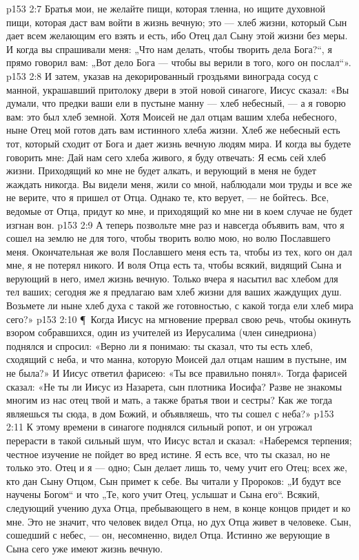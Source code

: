 \vs p153 2:7 Братья мои, не желайте пищи, которая тленна, но ищите духовной пищи, которая даст вам войти в жизнь вечную; это --- хлеб жизни, который Сын дает всем желающим его взять и есть, ибо Отец дал Сыну этой жизни без меры. И когда вы спрашивали меня: „Что нам делать, чтобы творить дела Бога?“, я прямо говорил вам: „Вот дело Бога --- чтобы вы верили в того, кого он послал“».
\vs p153 2:8 И затем, указав на декорированный гроздьями винограда сосуд с манной, украшавший притолоку двери в этой новой синагоге, Иисус сказал: «Вы думали, что предки ваши ели в пустыне манну --- хлеб небесный, --- а я говорю вам: это был хлеб земной. Хотя Моисей не дал отцам вашим хлеба небесного, ныне Отец мой готов дать вам истинного хлеба жизни. Хлеб же небесный есть тот, который сходит от Бога и дает жизнь вечную людям мира. И когда вы будете говорить мне: Дай нам сего хлеба живого, я буду отвечать: Я есмь сей хлеб жизни. Приходящий ко мне не будет алкать, и верующий в меня не будет жаждать никогда. Вы видели меня, жили со мной, наблюдали мои труды и все же не верите, что я пришел от Отца. Однако те, кто верует, --- не бойтесь. Все, ведомые от Отца, придут ко мне, и приходящий ко мне ни в коем случае не будет изгнан вон.
\vs p153 2:9 А теперь позвольте мне раз и навсегда объявить вам, что я сошел на землю не для того, чтобы творить волю мою, но волю Пославшего меня. Окончательная же воля Пославшего меня есть та, чтобы из тех, кого он дал мне, я не потерял никого. И воля Отца есть та, чтобы всякий, видящий Сына и верующий в него, имел жизнь вечную. Только вчера я насытил вас хлебом для тел ваших; сегодня же я предлагаю вам хлеб жизни для ваших жаждущих душ. Возьмете ли ныне хлеб духа с такой же готовностью, с какой тогда ели хлеб мира сего?»
\vs p153 2:10 \P\ Когда Иисус на мгновение прервал свою речь, чтобы окинуть взором собравшихся, один из учителей из Иерусалима (член синедриона) поднялся и спросил: «Верно ли я понимаю: ты сказал, что ты есть хлеб, сходящий с неба, и что манна, которую Моисей дал отцам нашим в пустыне, им не была?» И Иисус ответил фарисею: «Ты все правильно понял». Тогда фарисей сказал: «Не ты ли Иисус из Назарета, сын плотника Иосифа? Разве не знакомы многим из нас отец твой и мать, а также братья твои и сестры? Как же тогда являешься ты сюда, в дом Божий, и объявляешь, что ты сошел с неба?»
\vs p153 2:11 К этому времени в синагоге поднялся сильный ропот, и он угрожал перерасти в такой сильный шум, что Иисус встал и сказал: «Наберемся терпения; честное изучение не пойдет во вред истине. Я есть все, что ты сказал, но не только это. Отец и я --- одно; Сын делает лишь то, чему учит его Отец; всех же, кто дан Сыну Отцом, Сын примет к себе. Вы читали у Пророков: „И будут все научены Богом“ и что „Те, кого учит Отец, услышат и Сына его“. Всякий, следующий учению духа Отца, пребывающего в нем, в конце концов придет и ко мне. Это не значит, что человек видел Отца, но дух Отца живет в человеке. Сын, сошедший с небес, --- он, несомненно, видел Отца. Истинно же верующие в Сына сего уже имеют жизнь вечную.

